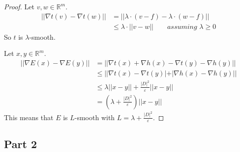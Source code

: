 \documentclass[10pt,a4paper]{article}
\begin{document}
\begin{proof}
  Let $v, w \in \mathbb{R}^{m}$.
  \begin{align*}
    ~||\nabla t(v) - \nabla t(w)|| & = \left|\left| \lambda \cdot (v - f) - \lambda \cdot (w - f) \right|\right|\\
                                   & \le \lambda \cdot ||v - w|| \qquad \textit{assuming $\lambda \ge 0$}
  \end{align*}
  So $t$ is $\lambda$-smooth.

  Let $x, y \in \mathbb{R}^{m}$.
  \begin{align*}
    ~||\nabla E(x) - \nabla E(y)|| & = ||\nabla t(x) + \nabla h(x) - \nabla t(y) - \nabla h(y)||\\
                                   & \le ||\nabla t(x) - \nabla t(y)| + |\nabla h(x) - \nabla h(y)||\\
                                   & \le \lambda ||x - y|| + \frac{|D|^{2}}{\varepsilon} ||x - y||\\
                                   & = \left( \lambda + \frac{|D|^{2}}{\varepsilon} \right) ||x - y||
  \end{align*}
  This means that $E$ is $L$-smooth with $L = \lambda + \frac{|D|^{2}}{\varepsilon}$.
\end{proof}

\subsection*{Part 2}
\end{document}
